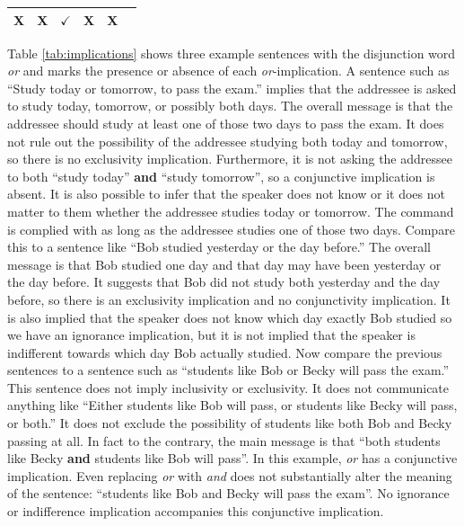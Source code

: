 \documentclass[oneside]{report}
\theoremstyle{definition}
\theoremstyle{definition}
\theoremstyle{definition}
\theoremstyle{remark}
\begin{document}
\begin{longtable}[]{@{}lccccc@{}}
\begin{minipage}[t]{0.05\columnwidth}
X\strut
\end{minipage} & \begin{minipage}[t]{0.05\columnwidth}\centering\strut
X\strut
\end{minipage} & \begin{minipage}[t]{0.05\columnwidth}\centering\strut
\(\checkmark\)\strut
\end{minipage} & \begin{minipage}[t]{0.12\columnwidth}\centering\strut
X\strut
\end{minipage} & \begin{minipage}[t]{0.12\columnwidth}\centering\strut
X\strut
\end{minipage}\tabularnewline
\bottomrule
\end{longtable}
Table \ref{tab:implications} shows three example sentences with the
disjunction word \emph{or} and marks the presence or absence of each
\emph{or}-implication. A sentence such as ``Study today or tomorrow, to
pass the exam.'' implies that the addressee is asked to study today,
tomorrow, or possibly both days. The overall message is that the
addressee should study at least one of those two days to pass the exam.
It does not rule out the possibility of the addressee studying both
today and tomorrow, so there is no exclusivity implication. Furthermore,
it is not asking the addressee to both ``study today'' \textbf{and}
``study tomorrow'', so a conjunctive implication is absent. It is also
possible to infer that the speaker does not know or it does not matter
to them whether the addressee studies today or tomorrow. The command is
complied with as long as the addressee studies one of those two days.
Compare this to a sentence like ``Bob studied yesterday or the day
before.'' The overall message is that Bob studied one day and that day
may have been yesterday or the day before. It suggests that Bob did not
study both yesterday and the day before, so there is an exclusivity
implication and no conjunctivity implication. It is also implied that
the speaker does not know which day exactly Bob studied so we have an
ignorance implication, but it is not implied that the speaker is
indifferent towards which day Bob actually studied. Now compare the
previous sentences to a sentence such as ``students like Bob or Becky
will pass the exam.'' This sentence does not imply inclusivity or
exclusivity. It does not communicate anything like ``Either students
like Bob will pass, or students like Becky will pass, or both.'' It does
not exclude the possibility of students like both Bob and Becky passing
at all. In fact to the contrary, the main message is that ``both
students like Becky \textbf{and} students like Bob will pass''. In this
example, \emph{or} has a conjunctive implication. Even replacing
\emph{or} with \emph{and} does not substantially alter the meaning of
the sentence: ``students like Bob and Becky will pass the exam''. No
ignorance or indifference implication accompanies this conjunctive
implication.
\end{document}
